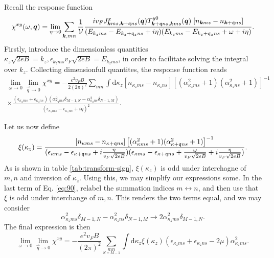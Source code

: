 Recall the response function
\begin{equation}
  \chi ^{xy} (\omega , \bm{q}) =
  \lim_{\eta \to 0}
  \sum\limits_{\bm{k}, mn}^{}
  \frac{1}{\mathcal{V}}
  \frac{
    i v_F  J^x_{\bm{k} m s, \bm{k}+\mathfrak{q} n s}(\bm{q})
    T^{y 0}_{\bm{k}+\mathfrak{q} ns, \bm{k}ms}(\bm{q})
    \;
    [n_{\bm{k} m s}- n_{\bm{k}+\mathfrak{q} ns }]
  }{
    (E_{k_z m s} - E_{k_z + \mathfrak{q}_z ns} + i   \eta )
    (E_{k_z m s} - E_{k_z + \mathfrak{q}_z ns} +  \omega + i   \eta )
  }
  .
\end{equation}
Firstly, introduce the dimensionless quantities \( \kappa_z \sqrt{2 eB} = k_z, \epsilon_{k_z m s} v_F \sqrt{2 e B} = E_{k_z m s}  \), in order to facilitate solving the integral over \( k_z \).
Collecting dimensionfull quantites, the response function reads
\begin{multline}
  \label{eq:90}
\lim_{\omega \to 0} \lim_{\vec{q} \to 0} \chi^{xy} =
  -\frac{e^2 v_F B }{2 (2 \pi)^2}
  \sum\limits_{m n}^{}
  \int \mathrm{d} \kappa_z
  [n_{\kappa_z m s} - n_{\kappa_z n s}]
  [(\alpha_{\kappa_z m s}^2 + 1) (\alpha_{\kappa_z n s}^2 + 1)]^{-1}\\
  \times
  \frac{
    (\epsilon_{\kappa_z m s} + \epsilon_{\kappa_z n s})
    (\alpha_{\kappa_z m s}^2 \delta_{M-1, N} - \alpha_{\kappa_z n s}^2 \delta_{N-1, M})
  }{
    (\epsilon_{\kappa_z m s} - \epsilon_{\kappa_z n s} + i \eta)^2
  }.
\end{multline}

Let us now define
\begin{equation}
  \xi(\kappa_z) = \frac{[n_{\kappa ms} - n_{\kappa + \mathfrak{q} ns}]
  \left[ (\alpha_{\kappa ms}^2 + 1) (\alpha_{\kappa +\mathfrak{q} ns}^2 + 1) \right]^{-1}
  }{
    (\epsilon _{\kappa m s} - \epsilon _{\kappa +\mathfrak{q}ns} + i \frac{  \eta }{v_F\sqrt{2 e B  }})
    (\epsilon _{\kappa m s} - \epsilon _{\kappa +\mathfrak{q}ns} + \frac{ \omega }{v_F \sqrt{2 e B  }} + i \frac{  \eta }{v_F\sqrt{2 e B  }})
  }.
\end{equation}
As is shown in table \ref{tab:transform-sign}, \( \xi(\kappa_z) \) is odd under interchagne of \( m,n \) and inversion of \( \kappa_z \).
Using this, we may simplify our expressions some.
In the last term of Eq. \eqref{eq:90}, relabel the summation indices \( m \leftrightarrow n \), and then use that \( \xi \) is odd under interchange of \( m,n \).
This renders the two terms equal, and we may consider
\[
\alpha_{\kappa_z m s}^2 \delta_{M-1,N} - \alpha_{\kappa_z n s}^2 \delta_{N-1, M} \to 2 \alpha_{\kappa_z m s}^2 \delta_{M-1, N}.
\]
The final expression is then
\begin{equation}
  \label{eq:91}
  \lim_{\omega \to 0} \lim_{\vec{q} \to 0} \chi^{xy} =
  -\frac{e^2 v_F B}{(2 \pi)^2} \sum\limits_{\underset{N=M-1}{mn}}
  \int \mathrm{d}\kappa_z \xi(\kappa_z)
  (\epsilon_{\kappa_z m s} + \epsilon_{\kappa_z n s} - 2 \mu) \alpha_{\kappa_z m s}^2.
\end{equation}

